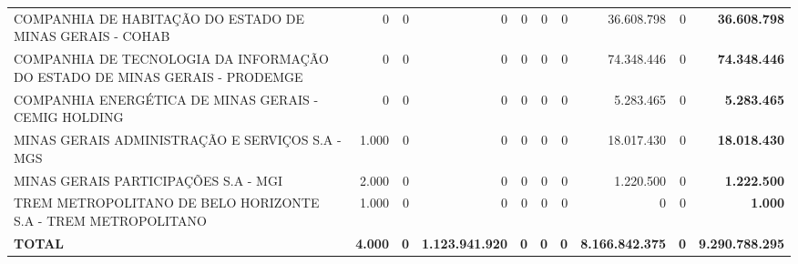 \documentclass{article}
\begin{document}
\begin{longtable}[c]{m{2.0cm}|m{1.35cm}|m{1.35cm}|m{1.35cm}|m{1.35cm}|m{1.35cm}|m{1.35cm}|m{1.35cm}|m{1.35cm}|m{1.0cm}}
\multicolumn{1}{L{4cm}|}{COMPANHIA DE HABITAÇÃO DO ESTADO DE MINAS GERAIS - COHAB} & \multicolumn{1}{r|}{    0} & \multicolumn{1}{r|}{0} & \multicolumn{1}{r|}{            0} & \multicolumn{1}{r|}{0} & \multicolumn{1}{r|}{0} & \multicolumn{1}{r|}{0} & \multicolumn{1}{r|}{36.608.798} & \multicolumn{1}{r|}{0} & \multicolumn{1}{r}{ \textbf{36.608.798}} \\
\multicolumn{1}{L{4cm}|}{COMPANHIA DE TECNOLOGIA DA INFORMAÇÃO DO ESTADO DE MINAS GERAIS - PRODEMGE} & \multicolumn{1}{r|}{    0} & \multicolumn{1}{r|}{0} & \multicolumn{1}{r|}{            0} & \multicolumn{1}{r|}{0} & \multicolumn{1}{r|}{0} & \multicolumn{1}{r|}{0} & \multicolumn{1}{r|}{74.348.446} & \multicolumn{1}{r|}{0} & \multicolumn{1}{r}{ \textbf{74.348.446}} \\
\multicolumn{1}{L{4cm}|}{COMPANHIA ENERGÉTICA DE MINAS GERAIS - CEMIG HOLDING} & \multicolumn{1}{r|}{    0} & \multicolumn{1}{r|}{0} & \multicolumn{1}{r|}{            0} & \multicolumn{1}{r|}{0} & \multicolumn{1}{r|}{0} & \multicolumn{1}{r|}{0} & \multicolumn{1}{r|}{5.283.465} & \multicolumn{1}{r|}{0} & \multicolumn{1}{r}{ \textbf{5.283.465}} \\
\multicolumn{1}{L{4cm}|}{MINAS GERAIS ADMINISTRAÇÃO E SERVIÇOS S.A - MGS} & \multicolumn{1}{r|}{1.000} & \multicolumn{1}{r|}{0} & \multicolumn{1}{r|}{            0} & \multicolumn{1}{r|}{0} & \multicolumn{1}{r|}{0} & \multicolumn{1}{r|}{0} & \multicolumn{1}{r|}{18.017.430} & \multicolumn{1}{r|}{0} & \multicolumn{1}{r}{ \textbf{18.018.430}} \\
\multicolumn{1}{L{4cm}|}{MINAS GERAIS PARTICIPAÇÕES S.A - MGI} & \multicolumn{1}{r|}{2.000} & \multicolumn{1}{r|}{0} & \multicolumn{1}{r|}{            0} & \multicolumn{1}{r|}{0} & \multicolumn{1}{r|}{0} & \multicolumn{1}{r|}{0} & \multicolumn{1}{r|}{1.220.500} & \multicolumn{1}{r|}{0} & \multicolumn{1}{r}{ \textbf{1.222.500}} \\
\multicolumn{1}{L{4cm}|}{TREM METROPOLITANO DE BELO HORIZONTE S.A - TREM METROPOLITANO} & \multicolumn{1}{r|}{1.000} & \multicolumn{1}{r|}{0} & \multicolumn{1}{r|}{            0} & \multicolumn{1}{r|}{0} & \multicolumn{1}{r|}{0} & \multicolumn{1}{r|}{0} & \multicolumn{1}{r|}{            0} & \multicolumn{1}{r|}{0} & \multicolumn{1}{r}{ \textbf{1.000}} \\
\hline
\multicolumn{1}{L{4cm}|}{ \textbf{TOTAL}} & \multicolumn{1}{r|}{ \textbf{4.000}} & \multicolumn{1}{r|}{ \textbf{0}} & \multicolumn{1}{r|}{ \textbf{1.123.941.920}} & \multicolumn{1}{r|}{ \textbf{0}} & \multicolumn{1}{r|}{ \textbf{0}} & \multicolumn{1}{r|}{ \textbf{0}} & \multicolumn{1}{r|}{ \textbf{8.166.842.375}} & \multicolumn{1}{r|}{ \textbf{0}} & \multicolumn{1}{r}{ \textbf{9.290.788.295}} \\
\end{longtable}
\newpage
{}
\end{document}
